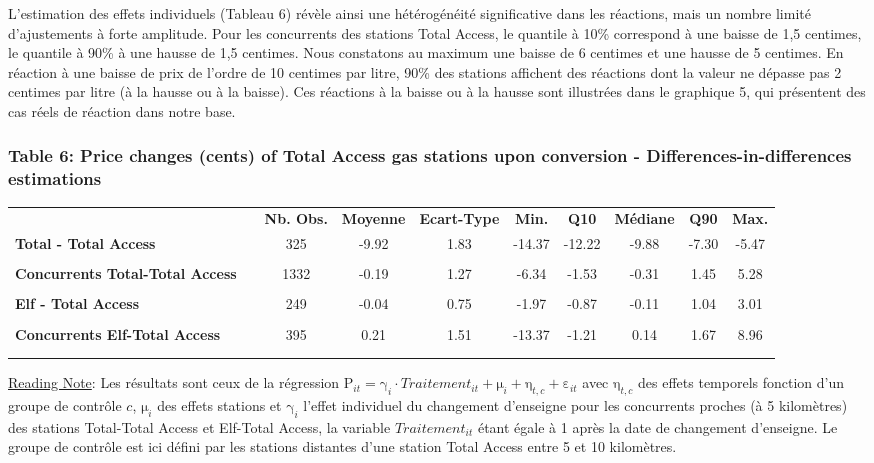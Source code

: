 \documentclass[english]{article}
\begin{document}
L'estimation des effets individuels (Tableau 6) révèle ainsi une hétérogénéité
significative dans les réactions, mais un nombre limité d'ajustements
à forte amplitude. Pour les concurrents des stations Total Access,
le quantile à 10\% correspond à une baisse de 1,5 centimes, le quantile
à 90\% à une hausse de 1,5 centimes. Nous constatons au maximum une
baisse de 6 centimes et une hausse de 5 centimes. En réaction à une
baisse de prix de l'ordre de 10 centimes par litre, 90\% des stations
affichent des réactions dont la valeur ne dépasse pas 2 centimes par
litre (à la hausse ou à la baisse). Ces réactions à la baisse ou à
la hausse sont illustrées dans le graphique 5, qui présentent des
cas réels de réaction dans notre base. \medskip{}


\newpage{}


\subsubsection*{Table 6: Price changes (cents) of Total Access gas  stations upon conversion - Differences-in-differences estimations}

\begin{center}
\begin{scriptsize} %
\begin{tabular}{llcccccccc}
 &  &  &  &  &  &  &  &  & \tabularnewline
\hline
\hline
 &  & \textbf{Nb. Obs.}  & \textbf{Moyenne}  & \textbf{Ecart-Type}  & \textbf{Min.}  & \textbf{Q10}  & \textbf{Médiane}  & \textbf{Q90}  & \textbf{Max.}\tabularnewline
\hline
\textbf{Total - Total Access}  &  & 325  & -9.92  & 1.83  & -14.37  & -12.22  & -9.88  & -7.30  & -5.47\tabularnewline
 &  &  &  &  &  &  &  &  & \tabularnewline
\textbf{Concurrents Total-Total Access}  &  & 1332  & -0.19  & 1.27  & -6.34  & -1.53  & -0.31  & 1.45  & 5.28\tabularnewline
 &  &  &  &  &  &  &  &  & \tabularnewline
\hline
\textbf{Elf - Total Access}  &  & 249  & -0.04  & 0.75  & -1.97  & -0.87  & -0.11  & 1.04  & 3.01\tabularnewline
 &  &  &  &  &  &  &  &  & \tabularnewline
\textbf{Concurrents Elf-Total Access}  &  & 395  & 0.21  & 1.51  & -13.37  & -1.21  & 0.14  & 1.67  & 8.96\tabularnewline
 &  &  &  &  &  &  &  &  & \tabularnewline
\hline
\hline
 &  &  &  &  &  &  &  &  & \tabularnewline
\end{tabular}\end{scriptsize}
\par\end{center}

{\small{}\uline{Reading Note}}{\small{}:} Les résultats sont ceux de la régression $\mathrm{P}_{it}=\mathrm{\gamma}_{i}\cdot Traitement_{it}+\mathrm{\mu}_{i}+\mathrm{\eta}_{t,c}+\mathrm{\varepsilon}_{it}$ avec $\mathrm{\eta}_{t,c}$ des effets temporels fonction d'un groupe de contrôle $c$, $\mathrm{\mu}_{i}$ des effets stations et $\mathrm{\gamma}_{i}$ l'effet individuel du changement d'enseigne pour les concurrents proches (à 5 kilomètres) des stations Total-Total Access et Elf-Total Access, la variable $Traitement_{it}$ étant égale à 1 après la date de changement d'enseigne. Le groupe de contrôle est ici défini par les stations distantes d'une station Total Access entre 5 et 10 kilomètres.\medskip{}
\end{document}
